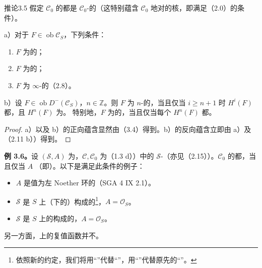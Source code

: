 \begin{SGAresult}{推论}{3.5}
假定 $\mathcal C_0$ 的都是 $\mathcal C_0$-的（这特别蕴含 $\mathcal C_0$ 地对的核，即满足（2.0）的条件）。

a）对于 $F\in\operatorname{ob}\mathcal C_S$，下列条件：
\begin{enumerate}
\item[(i)] $F$ 为的；
\item[(ii)] $F$ 为的；
\item[(iii)] $F$ 为 $\infty$-的（2.8）。
\end{enumerate}
b）设 $F\in\operatorname{ob}D^-(\mathcal C_S)$，$n\in\mathbb Z$。则
$F$ 为 $n$-的，当且仅当 $i\geq n+1$ 时 $H^i(F)$ 都，且 $H^n(F)$ 为。
特别地，$F$ 为的，当且仅当每个 $H^n(F)$ 都。
\end{SGAresult}
\begin{proof}
a）以及 b）的正向蕴含显然由（3.4）得到。b）的反向蕴含立即由 a）及（2.11 b））得到。
\end{proof}

\textbf{例 3.6。}设 $(\mathscr S,A)$ 为，$\mathcal C,\mathcal C_0$ 为（1.3 d））中的 $\mathscr S$-（亦见（2.15））。$\mathcal C_0$ 的都，当且仅当 $A$ （即）。以下是满足此条件的例子：
\begin{itemize}
\item $A$ 是值为左 Noether 环的（SGA 4 IX 2.1）。
\item $\mathscr S$ 是  $S$ 上（下的）构成的\footnote{依照新的约定，我们将用“”代替“”，用“”代替原先的“”。}，$A=\mathcal O_S$。
\item $\mathscr S$ 是 $S$ 上的构成的，$A=\mathcal O_S$。
\end{itemize}
另一方面，上的复值函数并不。


